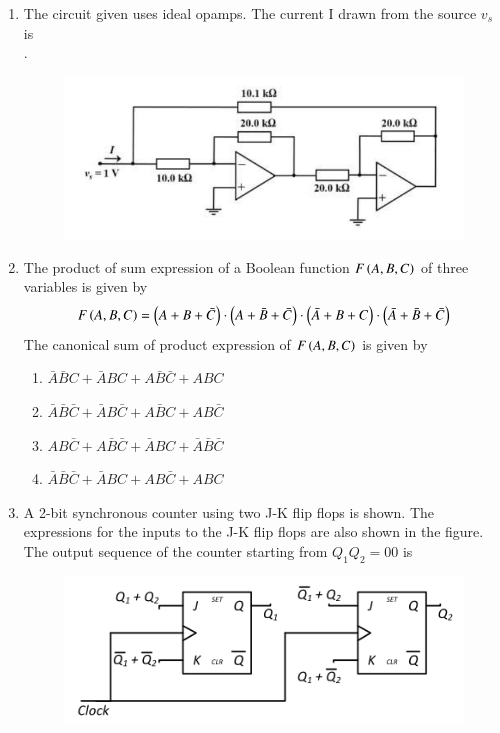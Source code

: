 \documentclass[journal,12pt,onecolumn]{IEEEtran}
\theoremstyle{remark}
\begin{document}
\begin{enumerate}
    \hfill{}

    \item The circuit given uses ideal opamps. The current I  drawn from the source $v_s$ is \\  \underline{\hspace{2cm}}.
    \begin{figure}[H]
        \centering
        \includegraphics[width=0.5\columnwidth]{q42.png}
        \caption*{}
        \label{fig:q42}
    \end{figure}
    
    \hfill{}

    \item The product of sum expression of a Boolean function $F\left(A, B, C\right)$ of three variables is given by
    $$ F\left(A, B, C\right) = \left( A + B + \bar{C} \right) \cdot \left(A + \bar{B} + \bar{C} \right) \cdot \left( \bar{A} + B + C \right) \cdot \left( \bar{A} + \bar{B} + \bar{C} \right) $$
    The canonical sum of product expression of $F\left(A, B, C\right)$ is given by
    
    \hfill{}
    \begin{enumerate}
        \item $\bar{A}\bar{B}C + \bar{A}B C + A\bar{B}\bar{C} + A B C$
        \item $\bar{A}\bar{B}\bar{C} + \bar{A}B\bar{C} + A\bar{B}C + AB\bar{C}$
        \item $A B \bar{C} + A \bar{B} \bar{C} + \bar{A} B C + \bar{A} \bar{B} \bar{C}$
        \item $\bar{A}\bar{B}\bar{C} + \bar{A}B C + A B \bar{C} + A B C$
    \end{enumerate}

    \item A 2-bit synchronous counter using two J-K flip flops is shown. The expressions for the inputs to the J-K flip flops are also shown in the figure. The output sequence of the counter starting from $Q_1Q_2 = 00$ is
    \begin{figure}[H]
        \centering
        \includegraphics[width=0.6\columnwidth]{q44.png}
        \caption*{}
        \label{fig:q44}
    \end{figure}
    

\end{enumerate}
\end{document}
